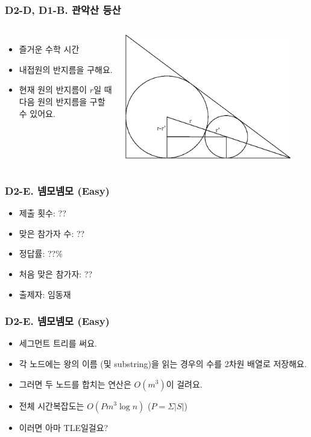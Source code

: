 \documentclass[xetex]{beamer}
\begin{document}
\begin{frame}
  \frametitle{D2-D, D1-B. 관악산 등산}
  \begin{columns}
      \begin{itemize}
        \item 즐거운 수학 시간
        \item 내접원의 반지름을 구해요.
        \item 현재 원의 반지름이 $r$일 때 다음 원의 반지름을 구할 수 있어요.
      \end{itemize}
      \includegraphics[width=0.9\textwidth]{pizza-solution.eps}
  \end{columns}
\end{frame}

\begin{frame}
  \frametitle{D2-E. 넴모넴모 (Easy)}
  \begin{itemize}
    \item 제출 횟수: ??
    \item 맞은 참가자 수: ??
    \item 정답률: ??\%
    \item 처음 맞은 참가자: ??
    \item 출제자: 임동재
  \end{itemize}
\end{frame}

\begin{frame}
  \frametitle{D2-E. 넴모넴모 (Easy)}
  \begin{itemize}
    \item 세그먼트 트리를 써요.
    \item 각 노드에는 왕의 이름 (및 substring)을 읽는 경우의 수를 2차원 배열로 저장해요.
    \item 그러면 두 노드를 합치는 연산은 $O(m^{3})$이 걸려요.
    \item 전체 시간복잡도는 $O(Pm^{3}\log n)$ ($P = \Sigma|S|$)
    \item 이러면 아마 TLE일걸요?
  \end{itemize}
\end{frame}
\end{document}
